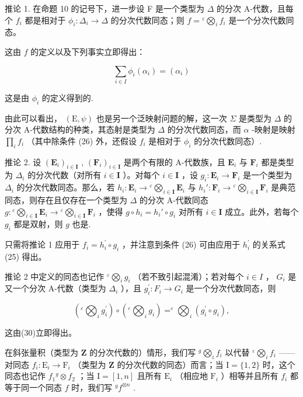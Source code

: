 推论 1. 在命题 10 的记号下，进一步设 F 是一个类型为 \(\Delta\) 的分次 A-代数，且每个 \(f_{i}\) 都是相对于 \(\phi_{i}:\Delta_{i}\to\Delta\) 的分次代数同态；则 \(f={}^{\varepsilon}\bigotimes_{i}f_{i}\) 是一个分次代数同态。

这由 \(f\) 的定义以及下列事实立即得出：

\[
\sum_ {i \in I} \phi_ {i} (\alpha_ {i}) = (\alpha_ {i})
\]

这是由 \(\phi_{i}\) 的定义得到的.

由此可以看出， \((\mathrm{E},\psi)\) 也是另一个泛映射问题的解，这一次 \(\Sigma\) 是类型为 \(\Delta\) 的分次 A-代数结构的种类，其态射是类型为 \(\Delta\) 的分次代数同态，而 \(\alpha\) -映射是映射 \(\prod_{i}f_{i}\) （其中除条件 (26) 外，还假设 \(f_{i}\) 是相对于 \(\phi_{i}\) 的分次代数同态）.

推论 2. 设 \((\mathbf{E}_i)_{i\in \mathbf{I}}\) , \((\mathbf{F}_i)_{i\in \mathbf{I}}\) 是两个有限的 A-代数族，且 \(\mathbf{E}_i\) 与 \(\mathbf{F}_i\) 都是类型为 \(\Delta_i\) 的分次代数（对所有 \(i\in \mathbf{I}\) ）。对每个 \(i\in \mathbf{I}\) ，设 \(g_i:\mathbf{E}_i\to \mathbf{F}_i\) 是一个类型为 \(\Delta_i\) 的分次代数同态。那么，若 \(h_i:\mathbf{E}_i\to {}^{\varepsilon}\bigotimes_{i\in \mathbf{I}}\mathbf{E}_i\) 与 \(h_i':\mathbf{F}_i\to {}^{\varepsilon}\bigotimes_{i\in \mathbf{I}}\mathbf{F}_i\) 是典范同态，则存在且仅存在一个类型为 \(\Delta\) 的分次 A-代数同态 \(g: {}^{\varepsilon}\bigotimes_{i\in \mathbf{I}}\mathbf{E}_i\to {}^{\varepsilon}\bigotimes_{i\in \mathbf{I}}\mathbf{F}_i\) ，使得 \(g\circ h_i = h_i'\circ g_i\) 对所有 \(i\in \mathbf{I}\) 成立。此外，若每个 \(g_i\) 都是双射，则 \(g\) 也是.

只需将推论 1 应用于 \(f_{i} = h_{i}^{\prime} \circ g_{i}\) ，并注意到条件 (26) 可由应用于 \(h_{i}^{\prime}\) 的关系式 (25) 得出。

推论 2 中定义的同态也记作 \({}^{\varepsilon}\bigotimes_{i} g_{i}\) （若不致引起混淆）；若对每个 \(i \in I\) ， \(G_{i}\) 是又一个分次 A-代数（类型为 \(\Delta_{i}\) ），且 \(g_{i}^{\prime}: F_{i} \to G_{i}\) 是一个分次代数同态，则

\[
\left(^ {\varepsilon} \bigotimes_ {i} g _ {i} ^ {\prime}\right) \circ \left(^ {\varepsilon} \bigotimes_ {i} g _ {i}\right) = ^ {\varepsilon} \bigotimes_ {i} \left(g _ {i} ^ {\prime} \circ g _ {i}\right),\tag{31}
\]

这由(30)立即得出。

在斜张量积（类型为 \(\mathbf{Z}\) 的分次代数的）情形，我们写 \({}^{g}\bigotimes_{i}f_{i}\) 以代替 \({}^{\varepsilon}\bigotimes_{i}f_{i}\) ——对同态 \(f_{i}: \mathrm{E}_{i} \to \mathrm{F}_{i}\) （类型为 \(\mathbf{Z}\) 的分次代数的同态）而言；当 \(\mathrm{I} = \{1, 2\}\) 时，这个同态也记作 \(f_{1}{}^{g}\otimes f_{2}\) ；当 \(\mathrm{I} = [1, n]\) 且所有 \(\mathrm{E}_{i}\) （相应地 \(\mathrm{F}_{i}\) ）相等并且所有 \(f_{i}\) 都等于同一个同态 \(f\) 时，我们写 \({}^{g}f^{\otimes n}\) .

